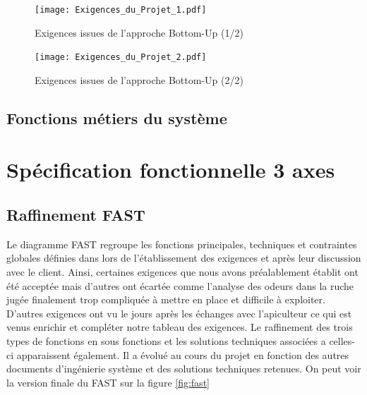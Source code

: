  
\begin{figure}[h!]
\centering\texttt{[image: Exigences\_du\_Projet\_1.pdf]}
\caption{\label{fig:exi1} Exigences issues de l'approche Bottom-Up (1/2)}
\end{figure}

 
\begin{figure}[h!]
\centering\texttt{[image: Exigences\_du\_Projet\_2.pdf]}
\caption{\label{fig:exi2} Exigences issues de l'approche Bottom-Up (2/2)}
\end{figure}

\clearpage

\section{Fonctions métiers du système}
\vspace{1.5cm}


\chapter{Spécification fonctionnelle  3 axes}

\section{Raffinement FAST}
\vspace{1.5cm}
Le diagramme FAST regroupe les fonctions principales, techniques et contraintes globales définies dans lors de 
l'établissement des exigences et après leur discussion avec le client. Ainsi, certaines exigences que nous avons préalablement établit ont été acceptée mais d'autres ont écartée comme l'analyse des odeurs dans la ruche jugée finalement trop compliquée à mettre en place et difficile à exploiter. D'autres exigences ont vu le jours après les échanges avec l'apiculteur ce qui est venus enrichir et compléter notre tableau des exigences. Le raffinement des trois types de fonctions en sous fonctions et les solutions techniques 
associées a celles-ci apparaissent également. Il a évolué au cours du projet en fonction des autres documents 
d'ingénierie système et des solutions techniques retenues. 
On peut voir la version finale du FAST sur la figure \ref{fig:fast}

